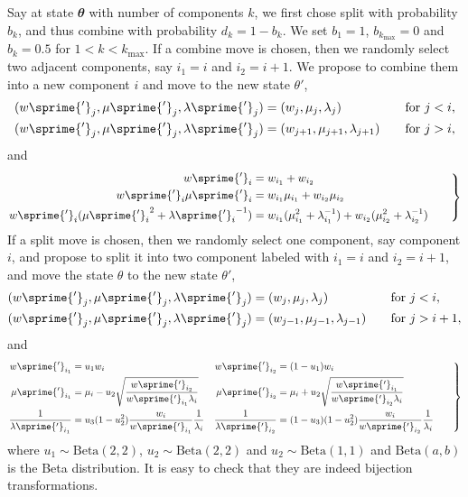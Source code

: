 \documentclass[11pt, linespread = 1.1, lines=40, lineratio = 30, bib,
fontset = Minion]{marticle}
\def\btheta{\mathbfit{\theta}}
\def\kmax{k_{\mathrm{max}}}
\begin{document}
  Say at state $\btheta$ with number of components $k$, we first chose split
  with probability $b_k$, and thus combine with probability $d_k = 1 - b_k$.
  We set $b_1 = 1$, $b_{\kmax} = 0$ and $b_k = 0.5$ for $1 < k < \kmax$. If a
  combine move is chosen, then we randomly select two adjacent components, say
  $i_1 = i$ and $i_2 = i + 1$. We propose to combine them into a new
  component $i$ and move to the new state $\theta'$,
  \begin{align*}
    (w\sprime{'}_j, \mu\sprime{'}_j, \lambda\sprime{'}_j) &=
    (w_j,     \mu_j,     \lambda_j) && \quad\text{for }j < i, \\
    (w\sprime{'}_j, \mu\sprime{'}_j, \lambda\sprime{'}_j) &=
    (w_{j+1}, \mu_{j+1}, \lambda_{j+1}) && \quad\text{for }j > i,
  \end{align*}
  and
  \begin{equation}
    \left.\begin{aligned}
      w\sprime{'}_i &= w_{i_1} + w_{i_2} \\
      w\sprime{'}_i \mu\sprime{'}_i &= w_{i_1}\mu_{i_1} + w_{i_2}\mu_{i_2} \\
      w\sprime{'}_i({\mu\sprime{'}_i}^2 + {\lambda\sprime{'}_i}^{-1}) &=
      w_{i_1}(\mu_{i_1}^2 + \lambda_{i_1}^{-1}) +
      w_{i_2}(\mu_{i_2}^2 + \lambda_{i_2}^{-1})
    \end{aligned}\qquad\right\}\label{eq:combine_trans}
  \end{equation}
  If a split move is chosen, then we randomly select one component, say
  component $i$, and propose to split it into two component labeled with $i_1
  = i$ and $i_2 = i + 1$, and move the state $\theta$ to the new state
  $\theta'$,
  \begin{align*}
    (w\sprime{'}_j, \mu\sprime{'}_j, \lambda\sprime{'}_j) &=
    (w_j, \mu_j, \lambda_j) && \quad\text{for }j < i, \\
    (w\sprime{'}_j, \mu\sprime{'}_j, \lambda\sprime{'}_j) &=
    (w_{j-1}, \mu_{j-1}, \lambda_{j-1}) && \quad\text{for }j > i + 1,
  \end{align*}
  and
  \begin{equation}
    \left.\begin{aligned}
      w\sprime{'}_{i_1}   &= u_1w_i &
      w\sprime{'}_{i_2}   &= (1 - u_1)w_i \\
      \mu\sprime{'}_{i_1} &=
      \mu_i - u_2\sqrt{\frac{w\sprime{'}_{i_2}}{w\sprime{'}_{i_1}\lambda_i}} &
      \mu\sprime{'}_{i_2} &=
      \mu_i + u_2\sqrt{\frac{w\sprime{'}_{i_1}}{w\sprime{'}_{i_2}\lambda_i}} \\
      \frac{1}{\lambda\sprime{'}_{i_1}} &=
      u_3(1 - u_2^2)\frac{w_i}{w\sprime{'}_{i_1}}\frac{1}{\lambda_i} &
      \frac{1}{\lambda\sprime{'}_{i_2}} &=
      (1 - u_3)(1 - u_2^2)\frac{w_i}{w\sprime{'}_{i_2}}\frac{1}{\lambda_i}\\
    \end{aligned}\qquad\right\}\label{eq:split_trans}
  \end{equation}
  where $u_1\sim\mathrm{Beta}(2,2)$, $u_2\sim\mathrm{Beta}(2,2)$ and
  $u_2\sim\mathrm{Beta}(1,1)$ and $\mathrm{Beta}(a,b)$ is the Beta
  distribution. It is easy to check that they are indeed bijection
  transformations.
\end{document}
